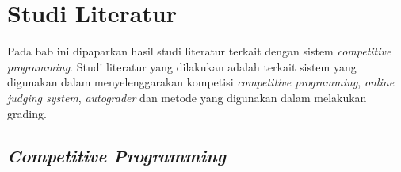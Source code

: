 \chapter{Studi Literatur}

\par Pada bab ini dipaparkan hasil studi literatur terkait dengan sistem \textit{competitive programming}. Studi literatur yang dilakukan adalah terkait sistem yang digunakan dalam menyelenggarakan kompetisi \textit{competitive programming}, \textit{online judging system}, \textit{autograder} dan metode yang digunakan dalam melakukan grading.

\section{\textit{Competitive Programming}}

